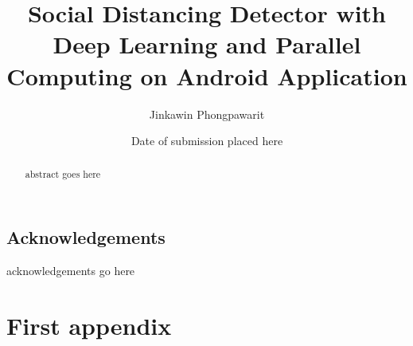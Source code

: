 \documentclass{mproj}
\begin{document}
\title{Social Distancing Detector with Deep Learning and Parallel Computing on Android Application}
\author{Jinkawin Phongpawarit}
\date{Date of submission placed here}
\maketitle

\begin{abstract}
abstract goes here
\end{abstract}

\educationalconsent


\newpage
\section*{Acknowledgements}

acknowledgements go here

\tableofcontents














\appendix %
\chapter{First appendix}
\end{document}
